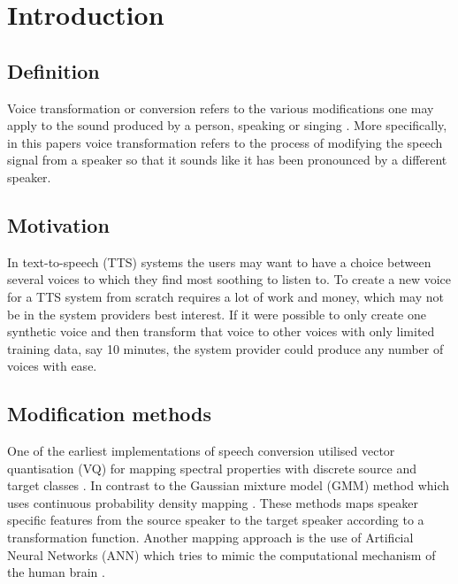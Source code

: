 \chapter{Introduction} %
\label{cha:introduction}


\section{Definition} %
\label{sec:definition}
Voice transformation or conversion refers to the various modifications one may apply to the sound produced by a person, speaking or singing \cite{stylianou08}. More specifically, in this papers voice transformation refers to the process of modifying the speech signal from a speaker so that it sounds like it has been pronounced by a different speaker. 

\section{Motivation} %
\label{sec:motivation}
In text-to-speech (TTS) systems the users may want to have a choice between several voices to which they find most soothing to listen to. To create a new voice for a TTS system from scratch requires a lot of work and money, which may not be in the system providers best interest. If it were possible to only create one synthetic voice and then transform that voice to other voices with only limited training data, say 10 minutes, the system provider could produce any number of voices with ease. 

\section{Modification methods} %
\label{sec:synthesis_methods}
One of the earliest implementations of speech conversion utilised vector quantisation (VQ) for mapping spectral properties with discrete source and target classes \cite{abe88}. In contrast to the Gaussian mixture model (GMM) method which uses continuous probability density mapping \cite{stylianou98}. These methods maps speaker specific features from the source speaker to the target speaker according to a transformation function. Another mapping approach is the use of Artificial Neural Networks (ANN) \cite{desai09} which tries to mimic the computational mechanism of the human brain \cite{young75}. 


